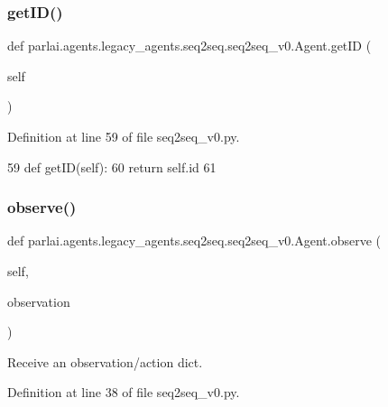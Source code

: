 \subsubsection{\texorpdfstring{get\+I\+D()}{getID()}}
{\footnotesize\ttfamily def parlai.\+agents.\+legacy\+\_\+agents.\+seq2seq.\+seq2seq\+\_\+v0.\+Agent.\+get\+ID (\begin{DoxyParamCaption}\item[{}]{self }\end{DoxyParamCaption})}



Definition at line 59 of file seq2seq\+\_\+v0.\+py.


\begin{DoxyCode}
59     \textcolor{keyword}{def }getID(self):
60         \textcolor{keywordflow}{return} self.id
61 
\end{DoxyCode}
\mbox{\label{classparlai_1_1agents_1_1legacy__agents_1_1seq2seq_1_1seq2seq__v0_1_1Agent_a39f030b5540055279a41d99dd8b8690c}} 
\subsubsection{\texorpdfstring{observe()}{observe()}}
{\footnotesize\ttfamily def parlai.\+agents.\+legacy\+\_\+agents.\+seq2seq.\+seq2seq\+\_\+v0.\+Agent.\+observe (\begin{DoxyParamCaption}\item[{}]{self,  }\item[{}]{observation }\end{DoxyParamCaption})}

\begin{DoxyVerb}Receive an observation/action dict.
\end{DoxyVerb}
 

Definition at line 38 of file seq2seq\+\_\+v0.\+py.


